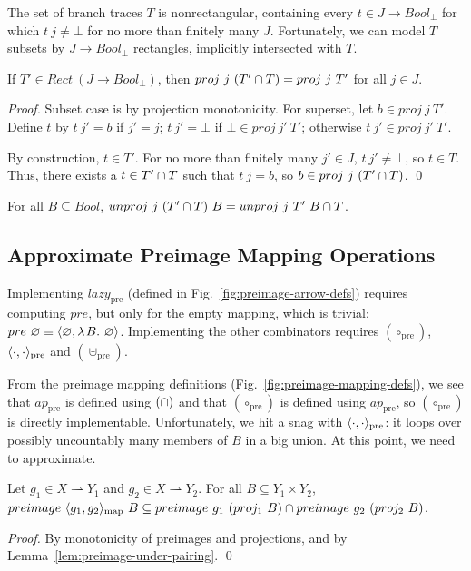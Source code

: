 \documentclass{llncs}
\newcommand{\figref}[1]{Fig.~\ref{#1}}
\newcommand{\pto}{\rightharpoonup}
\newcommand{\arrowlazy}{\ensuremath{lazy}}
\newcommand{\map}{_\mathrm{map}}
\newcommand{\pre}{_\mathrm{pre}}
\newcommand{\lazypre}{\arrowlazy\pre}
\begin{document}
The set of branch traces $T$ is nonrectangular, containing every $t \in J \to Bool_\bot$ for which $t~j \neq \bot$ for no more than finitely many $J$.
Fortunately, we can model $T$ subsets by $J \to Bool_\bot$ rectangles, implicitly intersected with $T$.

\begin{theorem}
If $T' \in Rect~(J \to Bool_\bot)$, then $proj~j~(T' \cap T) = proj~j~T'$ for all $j \in J$.
\end{theorem}
\begin{proof}
Subset case is by projection monotonicity.
For superset, let $b \in proj~j~T'$.
Define $t$ by $t~j' = b$ if $j' = j$; $t~j' = \bot$ if $\bot \in proj~j'~T'$; otherwise $t~j' \in proj~j'~T'$.

By construction, $t \in T'$.
For no more than finitely many $j' \in J$, $t~j' \neq \bot$, so $t \in T$.
Thus, there exists a $t \in T' \cap T$ such that $t~j = b$, so $b \in proj~j~(T' \cap T)$.
\qed
\end{proof}

\begin{corollary}
For all $B \subseteq Bool$, $unproj~j~(T' \cap T)~B = unproj~j~T'~B \cap T$.
\end{corollary}

\subsection{Approximate Preimage Mapping Operations}

Implementing $\lazypre$ (defined in \figref{fig:preimage-arrow-defs}) requires computing $pre$, but only for the empty mapping, which is trivial: $pre~\varnothing \equiv \langle{\varnothing,\lambda\mspace{2mu}{B}\ldotp\,\varnothing}\rangle$.
Implementing the other combinators requires $(\circ\pre)$, $\pair{\cdot,\cdot}\pre$ and $(\uplus\pre)$.

From the preimage mapping definitions (\figref{fig:preimage-mapping-defs}), we see that $ap\pre$ is defined using $(\cap)$ and that $(\circ\pre)$ is defined using $ap\pre$, so $(\circ\pre)$ is directly implementable.
Unfortunately, we hit a snag with $\pair{\cdot,\cdot}\pre$: it loops over possibly uncountably many members of $B$ in a big union.
At this point, we need to approximate.

\begin{theorem}
\label{thm:pair-preimage-approximation}
Let $g_1 \in X \pto Y_1$ and $g_2 \in X \pto Y_2$.
For all $B \subseteq Y_1 \times Y_2$, $preimage~\pair{g_1,g_2}\map~B \subseteq preimage~g_1~(proj_1~B) \i preimage~g_2~(proj_2~B)$.%
\end{theorem}
\begin{proof}
By monotonicity of preimages and projections, and by Lemma~\ref{lem:preimage-under-pairing}.
\qed
\end{proof}
\end{document}
